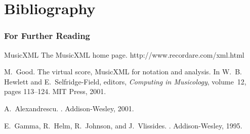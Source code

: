 \documentclass{paper}
\begin{document}
\section{Bibliography}
\begin{frame}
	\frametitle{For Further Reading}

\begin{thebibliography}{Alexandrescu, 2001}

{\scriptsize

MusicXML
\newblock The MusicXML home page.
\newblock http://www.recordare.com/xml.html

M.~Good.
\newblock The virtual score, MusicXML for notation and analysis.
\newblock In W.~B. Hewlett and E.~Selfridge-Field, editors, {\em Computing in
  Musicology}, volume~12, pages 113--124. MIT Press, 2001.

A.~Alexandrescu.
.
\newblock Addison-Wesley, 2001.

E.~Gamma, R.~Helm, R.~Johnson, and J.~Vlissides.
.
\newblock Addison-Wesley, 1995.

}
\end{thebibliography}

\end{frame}
\end{document}
